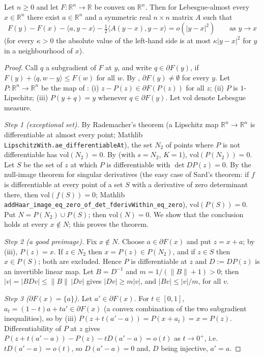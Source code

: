 \begin{theorem}
Let $n\ge0$ and let $F:\mathbb R^n\to\mathbb R$ be convex on $\mathbb R^n$. Then for Lebesgue-almost every $x\in\mathbb R^n$ there exist $a\in\mathbb R^n$ and a symmetric real $n\times n$ matrix $A$ such that
\[
F(y)-F(x)-\langle a,y-x\rangle-\tfrac12\langle A(y-x),y-x\rangle=o(|y-x|^2)\qquad\text{as }y\to x
\]
(for every $\kappa>0$ the absolute value of the left-hand side is at most $\kappa|y-x|^2$ for $y$ in a neighbourhood of $x$).
\end{theorem}
\begin{proof}
Call $q$ a subgradient of $F$ at $y$, and write $q\in\partial F(y)$, if $F(y)+\langle q,w-y\rangle\le F(w)$ for all $w$. By , $\partial F(y)\ne\emptyset$ for every $y$. Let $P:\mathbb R^n\to\mathbb R^n$ be the map of : (i) $z-P(z)\in\partial F(P(z))$ for all $z$; (ii) $P$ is $1$-Lipschitz; (iii) $P(y+q)=y$ whenever $q\in\partial F(y)$. Let $\mathrm{vol}$ denote Lebesgue measure.

\emph{Step 1 (exceptional set).} By Rademacher's theorem (a Lipschitz map $\mathbb R^n\to\mathbb R^n$ is differentiable at almost every point; Mathlib \texttt{LipschitzWith.ae\_differentiableAt}), the set $N_2$ of points where $P$ is not differentiable has $\mathrm{vol}(N_2)=0$. By  (with $s=N_2$, $K=1$), $\mathrm{vol}(P(N_2))=0$. Let $S$ be the set of $z$ at which $P$ is differentiable with $\det DP(z)=0$. By the null-image theorem for singular derivatives (the easy case of Sard's theorem: if $f$ is differentiable at every point of a set $S$ with a derivative of zero determinant there, then $\mathrm{vol}(f(S))=0$; Mathlib \texttt{addHaar\_image\_eq\_zero\_of\_det\_fderivWithin\_eq\_zero}), $\mathrm{vol}(P(S))=0$. Put $N=P(N_2)\cup P(S)$; then $\mathrm{vol}(N)=0$. We show that the conclusion holds at every $x\notin N$; this proves the theorem.

\emph{Step 2 (a good preimage).} Fix $x\notin N$. Choose $a\in\partial F(x)$ and put $z=x+a$; by (iii), $P(z)=x$. If $z\in N_2$ then $x=P(z)\in P(N_2)$, and if $z\in S$ then $x\in P(S)$; both are excluded. Hence $P$ is differentiable at $z$ and $D:=DP(z)$ is an invertible linear map. Let $B=D^{-1}$ and $m=1/(\|B\|+1)>0$; then $|v|=|BDv|\le\|B\|\,|Dv|$ gives $|Dv|\ge m|v|$, and $|Bv|\le|v|/m$, for all $v$.

\emph{Step 3 ($\partial F(x)=\{a\}$).} Let $a'\in\partial F(x)$. For $t\in[0,1]$, $a_t=(1-t)a+ta'\in\partial F(x)$ (a convex combination of the two subgradient inequalities), so by (iii) $P(z+t(a'-a))=P(x+a_t)=x=P(z)$. Differentiability of $P$ at $z$ gives $P(z+t(a'-a))-P(z)-tD(a'-a)=o(t)$ as $t\to0^+$, i.e.\ $tD(a'-a)=o(t)$, so $D(a'-a)=0$ and, $D$ being injective, $a'=a$.


\end{proof}
